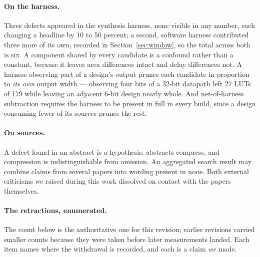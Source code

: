 \documentclass[11pt]{article}
\theoremstyle{definition}
\begin{document}
\paragraph{On the harness.} Three defects appeared in the synthesis harness, none
visible in any number, each changing a headline by 10 to 50 percent; a second,
software harness contributed three more of its own, recorded in
Section~\ref{sec:window}, so the total across both is six. A component shared by every
candidate is a confound rather than a constant, because it leaves area
differences intact and delay differences not. A harness observing part of a
design's output prunes each candidate in proportion to \emph{its own} output
width --- observing four bits of a 32-bit datapath left 27 LUTs of 179 while
leaving an adjacent 6-bit design nearly whole. And net-of-harness subtraction
requires the harness to be present in full in every build, since a design
consuming fewer of its sources prunes the rest.

\paragraph{On sources.} A defect found in an abstract is a hypothesis: abstracts
compress, and compression is indistinguishable from omission. An aggregated
search result may combine claims from several papers into wording present in
none. Both external criticisms we raised during this work dissolved on contact
with the papers themselves.

\paragraph{The retractions, enumerated.} The count below is the authoritative one
for this revision; earlier revisions carried smaller counts because they were
taken before later measurements landed. Each item names where the withdrawal is
recorded, and each is a claim \emph{we} made.
\end{document}
